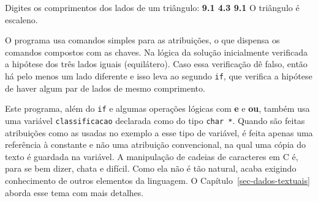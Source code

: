 \documentclass[
  11pt,
  a4paper,
]{scrbook}
\newenvironment{Shaded}{\begin{snugshade}}{\end{snugshade}}
\newcommand{\KeywordTok}[1]{\textcolor[rgb]{0.13,0.29,0.53}{\textbf{#1}}}
\newcommand{\NormalTok}[1]{#1}
\begin{document}
\begin{Shaded}
\begin{Highlighting}[]
\NormalTok{Digites os comprimentos dos lados de um triângulo: }\KeywordTok{ 9.1 4.3 9.1 }
\NormalTok{O triângulo é escaleno.}
\end{Highlighting}
\end{Shaded}

O programa usa comandos simples para as atribuições, o que dispensa os
comandos compostos com as chaves. Na lógica da solução inicialmente
verificada a hipótese dos três lados iguais (equilátero). Caso essa
verificação dê falso, então há pelo menos um lado diferente e isso leva
ao segundo \texttt{if}, que verifica a hipótese de haver algum par de
lados de mesmo comprimento.

Este programa, além do \texttt{if} e algumas operações lógicas com
\textbf{e} e \textbf{ou}, também usa uma variável \texttt{classificacao}
declarada como do tipo \texttt{char\ *}. Quando são feitas atribuições
como as usadas no exemplo a esse tipo de variável, é feita apenas uma
referência à constante e não uma atribuição convencional, na qual uma
cópia do texto é guardada na variável. A manipulação de cadeias de
caracteres em C é, para se bem dizer, chata e difícil. Como ela não é
tão natural, acaba exigindo conhecimento de outros elementos da
linguagem. O Capítulo~\ref{sec-dados-textuais} aborda esse tema com mais
detalhes.
\end{document}
